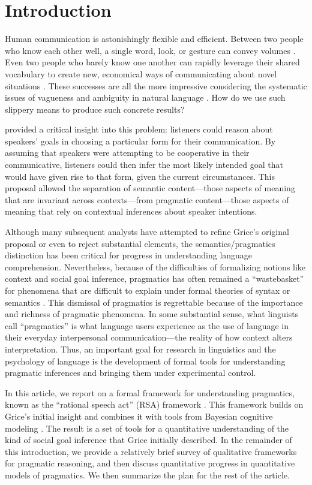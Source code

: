 \section{Introduction}

Human communication is astonishingly flexible and efficient. Between two people who know each other well, a single word, look, or gesture can convey volumes \cite{sperber1986,clark1996}. Even two people who barely know one another can rapidly leverage their shared vocabulary to create new, economical ways of communicating about novel situations \cite{brennan1996,clark1991}. These successes are all the more impressive considering the systematic issues of vagueness and ambiguity in natural language \cite{keefe1997,wasow2005}. How do we use such slippery means to produce such concrete results? 

 provided a critical insight into this problem: listeners could reason about speakers' goals in choosing a particular form for their communication. By assuming that speakers were attempting to be cooperative in their communicative, listeners could then infer the most likely intended goal that would have given rise to that form, given the current circumstances. This proposal allowed the separation of semantic content---those aspects of meaning that are invariant across contexts---from pragmatic content---those aspects of meaning that rely on contextual inferences about speaker intentions. 

Although many subsequent analysts have attempted to refine Grice's original proposal or even to reject substantial elements, the semantics/pragmatics distinction has been critical for progress in understanding language comprehension. Nevertheless, because of the difficulties of formalizing notions like context and social goal inference, pragmatics has often remained a ``wastebasket'' for phenomena that are difficult to explain under formal theories of syntax or semantics \cite{bar-hillel1971}. This dismissal of pragmatics is regrettable because of the importance and richness of pragmatic phenomena. In some substantial sense, what linguists call ``pragmatics'' is what language users experience as the use of language in their everyday interpersonal communication---the reality of how context alters interpretation. Thus, an important goal for research in linguistics and the psychology of language is the development of formal tools for understanding pragmatic inferences and bringing them under experimental control. 

In this article, we report on a formal framework for understanding pragmatics, known as the ``rational speech act'' (RSA) framework \cite<originally introduced in>{frank2012,goodman2013}. This framework builds on Grice's initial insight and combines it with tools from Bayesian cognitive modeling \cite{tenenbaum2011}. The result is a set of tools for a quantitative understanding of the kind of social goal inference that Grice initially described. In the remainder of this introduction, we provide a relatively brief survey of qualitative frameworks for pragmatic reasoning, and then discuss quantitative progress in quantitative models of pragmatics. We then summarize the plan for the rest of the article.

